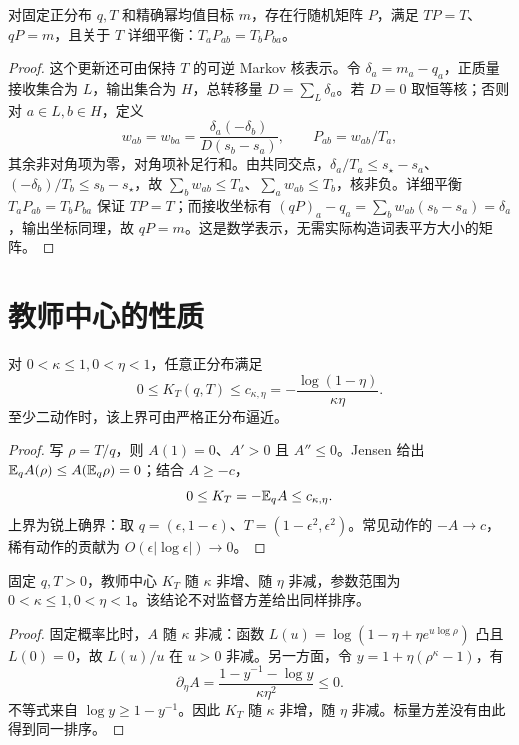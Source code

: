 \begin{proposition}
对固定正分布 $q,T$ 和精确幂均值目标 $m$，存在行随机矩阵 $P$，满足 $TP=T$、$qP=m$，且关于 $T$ 详细平衡：$T_aP_{ab}=T_bP_{ba}$。
\end{proposition}
\begin{proof}
这个更新还可由保持 $T$ 的可逆 Markov 核表示。令 $\delta_a=m_a-q_a$，正质量接收集合为 $L$，输出集合为 $H$，总转移量 $D=\sum_L\delta_a$。若 $D=0$ 取恒等核；否则对 $a\in L,b\in H$，定义
\begin{equation}
w_{ab}=w_{ba}=\frac{\delta_a(-\delta_b)}{D(s_b-s_a)},\qquad
P_{ab}=w_{ab}/T_a,
\end{equation}
其余非对角项为零，对角项补足行和。由共同交点，$\delta_a/T_a\le s_\star-s_a$、$(-\delta_b)/T_b\le s_b-s_\star$，故 $\sum_bw_{ab}\le T_a$、$\sum_aw_{ab}\le T_b$，核非负。详细平衡 $T_aP_{ab}=T_bP_{ba}$ 保证 $TP=T$；而接收坐标有 $(qP)_a-q_a=\sum_bw_{ab}(s_b-s_a)=\delta_a$，输出坐标同理，故 $qP=m$。这是数学表示，无需实际构造词表平方大小的矩阵。
\end{proof}

\section{教师中心的性质}
\begin{proposition}[教师中心的锐统一界]
对 $0<\kappa\le1,0<\eta<1$，任意正分布满足
\begin{equation}
0\le K_T(q,T)\le c_{\kappa,\eta}=-\frac{\log(1-\eta)}{\kappa\eta}.
\end{equation}
至少二动作时，该上界可由严格正分布逼近。
\end{proposition}
\begin{proof}
写 $\rho=T/q$，则 $A(1)=0$、$A'>0$ 且 $A''\le0$。Jensen 给出 $\mathbb E_qA(\rho)\le A(\mathbb E_q\rho)=0$；结合 $A\ge-c$，
\begin{equation}
0\le K_T=-\mathbb E_qA\le c_{\kappa,\eta}.
\end{equation}
上界为锐上确界：取 $q=(\epsilon,1-\epsilon)$、$T=(1-\epsilon^2,\epsilon^2)$。常见动作的 $-A\to c$，稀有动作的贡献为 $O(\epsilon|\log\epsilon|)\to0$。
\end{proof}

\begin{proposition}[中心对两个参数的单调性]
固定 $q,T>0$，教师中心 $K_T$ 随 $\kappa$ 非增、随 $\eta$ 非减，参数范围为 $0<\kappa\le1,0<\eta<1$。该结论不对监督方差给出同样排序。
\end{proposition}
\begin{proof}
固定概率比时，$A$ 随 $\kappa$ 非减：函数 $L(u)=\log(1-\eta+\eta e^{u\log\rho})$ 凸且 $L(0)=0$，故 $L(u)/u$ 在 $u>0$ 非减。另一方面，令 $y=1+\eta(\rho^\kappa-1)$，有
\begin{equation}
\partial_\eta A=\frac{1-y^{-1}-\log y}{\kappa\eta^2}\le0.
\end{equation}
不等式来自 $\log y\ge1-y^{-1}$。因此 $K_T$ 随 $\kappa$ 非增，随 $\eta$ 非减。标量方差没有由此得到同一排序。
\end{proof}

